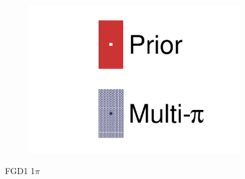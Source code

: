 \begin{figure}[h]
\begin{subfigure}[t]{0.32\textwidth}
	\end{subfigure}
	\begin{subfigure}[t]{0.32\textwidth}
		\includegraphics[width=\textwidth,page=30, trim={0mm 0mm 0mm 0mm}, clip]{figures/mach3/2018/data/2018a_FixedCov_RedCov_Mpi_Data_merge_drawPar_withDet}
	\end{subfigure}
	\caption{FGD1 1$\pi$}
	\label{fig:data_multipi_det_fdg1_cc1pi}
\end{figure}

